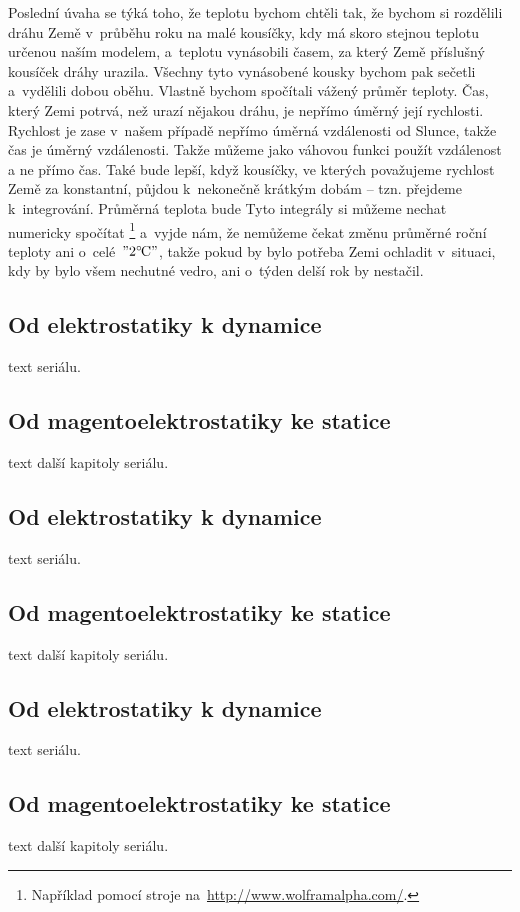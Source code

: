 \documentclass[twoside]{fksserie}
\begin{document}
Poslední úvaha se týká toho, že  teplotu bychom chtěli  tak, že
bychom si rozdělili dráhu 
Země v~průběhu roku na malé kousíčky, kdy má skoro stejnou teplotu
určenou naším modelem, a~teplotu vynásobili časem, za který Země příslušný
kousíček dráhy urazila. Všechny tyto vynásobené kousky bychom pak sečetli
a~vydělili dobou oběhu. Vlastně bychom spočítali vážený průměr teploty. 
Čas, který Zemi potrvá, než urazí nějakou dráhu, je 
nepřímo úměrný její rychlosti. Rychlost je zase v~našem případě nepřímo
úměrná vzdálenosti od Slunce, takže čas je úměrný vzdálenosti. Takže
můžeme jako váhovou funkci použít vzdálenost a ne přímo čas. Také
bude lepší, když kousíčky, ve kterých považujeme rychlost Země za konstantní,
půjdou k~nekonečně krátkým dobám -- tzn. přejdeme k~integrování. 
Průměrná teplota bude 
Tyto integrály si můžeme nechat numericky spočítat%
\footnote{Například pomocí stroje na~\url{http://www.wolframalpha.com/}.}
a~vyjde nám, že nemůžeme čekat změnu průměrné roční teploty ani o~celé~$"2 ^\circ\mskip-2mu\mathrm{C}"$, 
takže pokud by bylo potřeba Zemi ochladit v~situaci, kdy by bylo všem 
nechutné vedro, ani o~týden delší rok by nestačil.


\subsection{Od elektrostatiky k dynamice}
text seriálu.

\subsection{Od magentoelektrostatiky ke statice}
text další kapitoly seriálu.

\subsection{Od elektrostatiky k dynamice}
text seriálu.

\subsection{Od magentoelektrostatiky ke statice}
text další kapitoly seriálu.

\subsection{Od elektrostatiky k dynamice}
text seriálu.

\subsection{Od magentoelektrostatiky ke statice}
text další kapitoly seriálu.



\makefooter %
\end{document}
